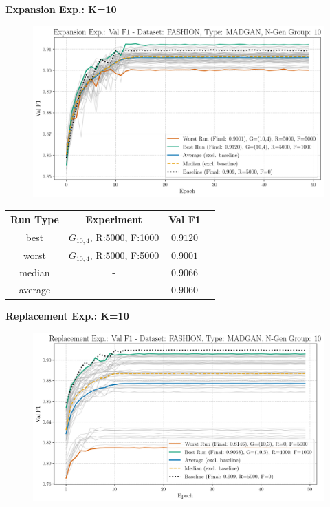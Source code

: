 \newpage
\noindent\textbf{Expansion Exp.: K=10}
\begin{figure}[htbp]
	\centering
	\includegraphics[width=.85\textwidth]{abb/strat_classifier_performance/FASHION_STRATIFIED_CLASSIFIERS_MADGAN_NEW/expansion_experiments/val_f1_score_MADGAN_FASHION_n_gen_10_all.png}
	\label{fig:app_strat_class_performance_expansion_exp._val_f1_score_10}
\end{figure}
\begin{table}[H]
	\vspace{-1em}
	\centering
	\begin{tabular}{|c|c|c|c|}
		\hline
		Run Type & Experiment & Val F1 \\ \hline
		best & \(G_{10, 4}\), R:5000, F:1000 & $0.9120$\\ \hline
		worst & \(G_{10, 4}\), R:5000, F:5000 & $0.9001$\\ \hline
		median & - & $0.9066$\\ \hline
		average & - & $0.9060$
		\\ \hline
	\end{tabular}
\end{table}
\noindent\textbf{Replacement Exp.: K=10}
\begin{figure}[htbp]
	\centering
	\includegraphics[width=.85\textwidth]{abb/strat_classifier_performance/FASHION_STRATIFIED_CLASSIFIERS_MADGAN_NEW/replacement_experiments/val_f1_score_MADGAN_FASHION_n_gen_10_all.png}
	\label{fig:app_strat_class_performance_replacement_exp._val_f1_score_10}
\end{figure}

